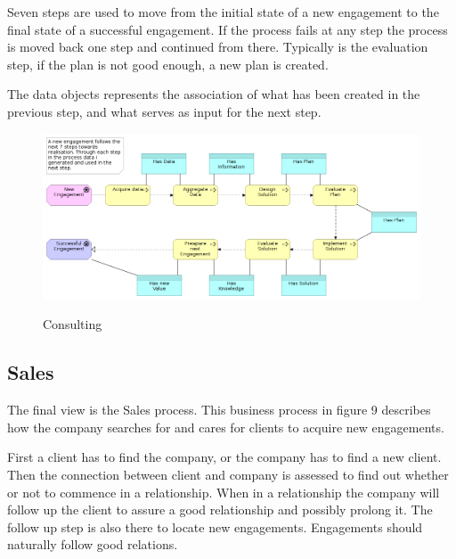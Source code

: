 \documentclass[12pt, a4paper]{article}
\begin{document}
Seven steps are used to move from the initial state of a new engagement to the
final state of a successful engagement. If the process fails at any step the
process is moved back one step and continued from there. Typically is the
evaluation step, if the plan is not good enough, a new plan is created.   

The data objects represents the association of what has been created in the
previous step, and what serves as input for the next step.  

\begin{figure}[htb]
    \centering
    \includegraphics[width=\textwidth]{Consulting} 
    \label{fig:Consulting}
    \caption{Consulting}
\end{figure}

\subsection{Sales}
The final view is the Sales process. This business process in figure 9
describes how the company searches for and cares for clients to acquire new
engagements.  

First a client has to find the company, or the company has to find a new
client. Then the connection between client and company is assessed to find out
whether or not to commence in a relationship. When in a relationship the
company will follow up the client to assure a good relationship and possibly
prolong it. The follow up step is also there to locate new engagements.
Engagements should naturally follow good relations. 
\end{document}
